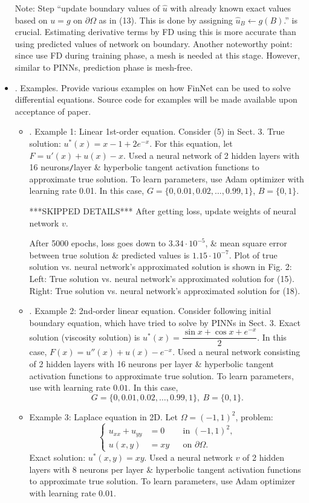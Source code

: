 \documentclass{article}
\begin{document}
\begin{itemize}
	Note: Step ``update boundary values of $\hat{u}$ with already known exact values based on $u = g$ on $\partial\Omega$ as in (13). This is done by assigning $\hat{u}_B\leftarrow g(B)$.'' is crucial. Estimating derivative terms by FD using this is more accurate than using predicted values of network on boundary. Another noteworthy point: since use FD during training phase, a mesh is needed at this stage. However, similar to PINNs, prediction phase is mesh-free.
	\item {. Examples.} Provide various examples on how FinNet can be used to solve differential equations. Source code for examples will be made available upon acceptance of paper.
	\begin{itemize}
		\item {. Example 1: Linear 1st-order equation.} Consider (5) in Sect. 3. True solution: $u^*(x) = x - 1 + 2e^{-x}$. For this equation, let $F = u'(x) + u(x) - x$. Used a neural network of 2 hidden layers with 16 neurons{\tt/}layer \& hyperbolic tangent activation functions to approximate true solution. To learn parameters, use Adam optimizer with learning rate 0.01. In this case, $G = \{0,0.01,0.02,\ldots,0.99,1\}$, $B = \{0,1\}$.
		
		***SKIPPED DETAILS***
		After getting loss, update weights of neural network $v$.
		
		After 5000 epochs, loss goes down to $3.34\cdot10^{-5}$, \& mean square error between true solution \& predicted values is $1.15\cdot10^{-7}$. Plot of true solution vs. neural network's approximated solution is shown in {\sf Fig. 2: Left: True solution vs. neural network's approximated solution for (15). Right: True solution vs. neural network's approximated solution for (18).}
		\item {. Example 2: 2nd-order linear equation.} Consider following initial boundary equation, which have tried to solve by PINNs in Sect. 3. Exact solution (viscosity solution) is $u^*(x) = \dfrac{\sin x + \cos x + e^{-x}}{2}$. In this case, $F(x) = u''(x) + u(x) - e^{-x}$. Used a neural network consisting of 2 hidden layers with 16 neurons per layer \& hyperbolic tangent activation functions to approximate true solution. To learn parameters, use  with learning rate $0.01$. In this case,
		\begin{equation*}
			G = \{0,0.01,0.02,\ldots,0.99,1\},\ B = \{0,1\}.
		\end{equation*}
		\item {\sf Example 3: Laplace equation in 2D.} Let $\Omega = (-1,1)^2$, problem:
		\begin{equation*}
			\left\{\begin{split}
				u_{xx} + u_{yy} &= 0&&\mbox{in }(-1,1)^2,\\
				u(x,y) &= xy&&\mbox{on }\partial\Omega.
			\end{split}\right.
		\end{equation*}
		Exact solution: $u^*(x,y) = xy$. Used a neural network $v$ of 2 hidden layers with 8 neurons per layer \& hyperbolic tangent activation functions to approximate true solution. To learn parameters, use Adam optimizer with learning rate $0.01$.
		

\end{itemize}
\end{itemize}
\end{document}
